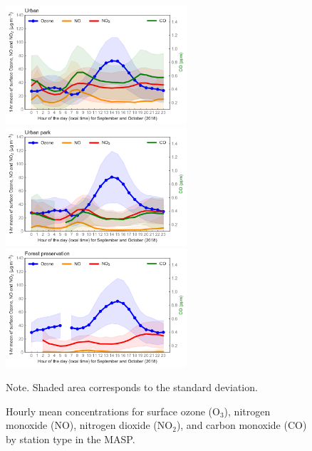 	
	\begin{figure}[!htb]
		\begin{center}
			\includegraphics[width=0.6\textwidth]{fig/aqHourSep_Urban.pdf}
			\includegraphics[width=0.6\textwidth]{fig/aqHourSep_Urban park.pdf}
			\includegraphics[width=0.6\textwidth]{fig/aqHourSep_Forest preservation.pdf}
		\end{center}
		\caption{Hourly mean concentrations for surface ozone (O$_3$), nitrogen monoxide (NO), nitrogen dioxide (NO$_2$), and carbon monoxide (CO) by station type in the MASP.}
		{\scriptsize Note. Shaded area corresponds to the standard deviation. }
		\label{fig:aqHour}
	\end{figure}
	
